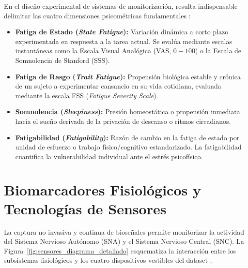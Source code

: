 En el diseño experimental de sistemas de monitorización, resulta indispensable delimitar las cuatro dimensiones psicométricas fundamentales \cite{kalanadhabhatta2021fatigueset}:
\begin{itemize}
    \item \textbf{Fatiga de Estado (\textit{State Fatigue}):} Variación dinámica a corto plazo experimentada en respuesta a la tarea actual. Se evalúa mediante escalas instantáneas como la Escala Visual Analógica (VAS, $0 - 100$) o la Escala de Somnolencia de Stanford (SSS).
    \item \textbf{Fatiga de Rasgo (\textit{Trait Fatigue}):} Propensión biológica estable y crónica de un sujeto a experimentar cansancio en su vida cotidiana, evaluada mediante la escala FSS (\textit{Fatigue Severity Scale}).
    \item \textbf{Somnolencia (\textit{Sleepiness}):} Presión homeostática o propensión inmediata hacia el sueño derivada de la privación de descanso o ritmos circadianos.
    \item \textbf{Fatigabilidad (\textit{Fatigability}):} Razón de cambio en la fatiga de estado por unidad de esfuerzo o trabajo físico/cognitivo estandarizado. La fatigabilidad cuantifica la vulnerabilidad individual ante el estrés psicofísico.
\end{itemize}



\section{Biomarcadores Fisiológicos y Tecnologías de Sensores}
\label{sec:teoria_sensores}

La captura no invasiva y continua de bioseñales permite monitorizar la actividad del Sistema Nervioso Autónomo (SNA) y el Sistema Nervioso Central (SNC). La Figura~\ref{fig:sensores_diagrama_detallado} esquematiza la interacción entre los subsistemas fisiológicos y los cuatro dispositivos vestibles del dataset \fatigueset{}.

